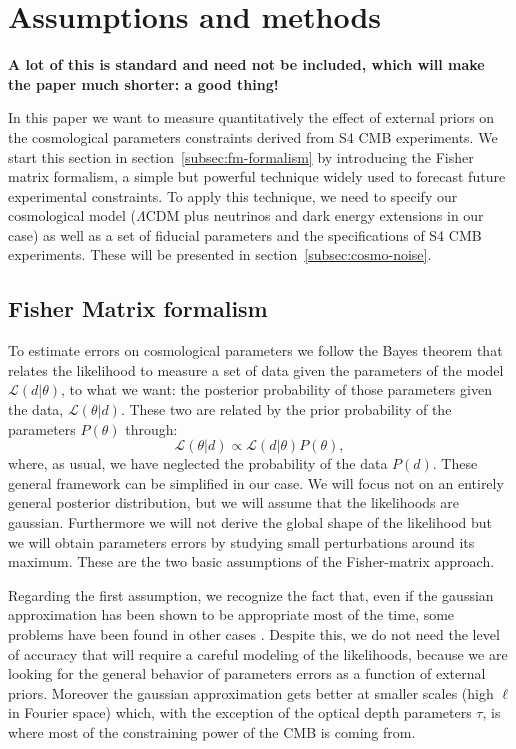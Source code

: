 \documentclass[aps,prd,reprint,superscriptaddress]{revtex4-1}
\newcommand{\refssec}[1]{section~\ref{subsec:#1}}
\begin{document}
\section{Assumptions and methods \label{sec:methods}}

{\bf A lot of this is standard and need not be included, which will make the paper much shorter: a good thing!}

In this paper we want to measure quantitatively the effect of external priors on the  cosmological parameters constraints derived from S4 CMB experiments.
We start this section in \refssec{fm-formalism} by introducing the Fisher matrix formalism, a simple but powerful technique widely used to forecast future experimental constraints. To apply this technique, we need to specify our cosmological model ($\Lambda$CDM plus neutrinos and dark energy extensions in our case) as well as a set of fiducial parameters and the specifications of S4 CMB experiments. These will be presented in \refssec{cosmo-noise}.


\subsection{Fisher Matrix formalism \label{subsec:fm-formalism}}
To estimate errors on cosmological parameters we follow the Bayes theorem that relates the likelihood to measure a set of data given the parameters of the model $\mathcal{L}(d|\theta)$, to what we want: the posterior probability of those parameters given the data, $\mathcal{L}(\theta|d)$.
These two are related by the prior probability of the parameters $P(\theta)$ through:
\begin{equation}
\mathcal{L}(\theta|d)\propto \mathcal{L}(d|\theta)P(\theta),
\end{equation}
where, as usual, we have neglected the probability of the data $P(d)$.
These general framework can be simplified in our case. We will focus not on an entirely general posterior distribution, but we will assume that the likelihoods are gaussian.
Furthermore we will not derive the global shape of the likelihood but we will obtain parameters errors by studying small perturbations around its maximum. These are the two basic assumptions of the Fisher-matrix approach.

Regarding the first assumption, we recognize the fact that, even if the gaussian approximation has been shown to be appropriate most of the time, some problems have been found in other cases \cite{2012JCAP...09..009W}. Despite this, we do not need the level of accuracy that will require a careful modeling of the likelihoods, because we are looking for the general behavior of parameters errors as a function of external priors.
Moreover the gaussian approximation gets better at smaller scales (high $\ell$ in Fourier space) which, with the exception of the optical depth parameters $\tau$, is where most of the constraining power of the CMB is coming from.
\end{document}
